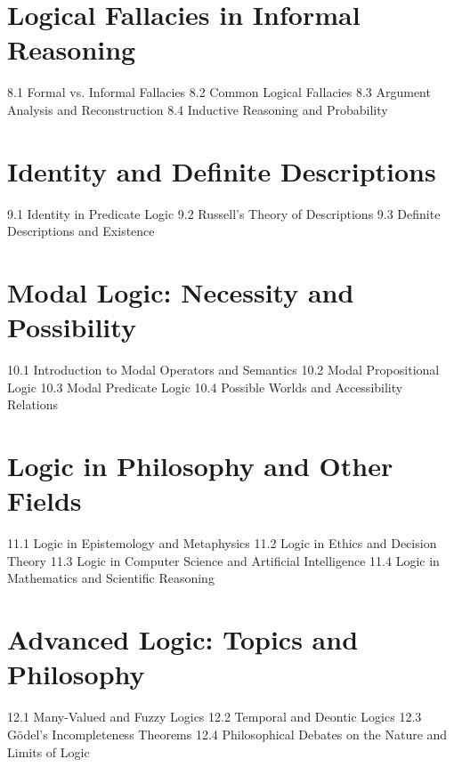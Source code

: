 \section{Logical Fallacies in Informal Reasoning}
8.1 Formal vs. Informal Fallacies
8.2 Common Logical Fallacies
8.3 Argument Analysis and Reconstruction
8.4 Inductive Reasoning and Probability
\section{Identity and Definite Descriptions}
9.1 Identity in Predicate Logic
9.2 Russell's Theory of Descriptions
9.3 Definite Descriptions and Existence
\section{Modal Logic: Necessity and Possibility}
10.1 Introduction to Modal Operators and Semantics
10.2 Modal Propositional Logic
10.3 Modal Predicate Logic
10.4 Possible Worlds and Accessibility Relations
\section{Logic in Philosophy and Other Fields}
11.1 Logic in Epistemology and Metaphysics
11.2 Logic in Ethics and Decision Theory
11.3 Logic in Computer Science and Artificial Intelligence
11.4 Logic in Mathematics and Scientific Reasoning
\section{Advanced Logic: Topics and Philosophy}
12.1 Many-Valued and Fuzzy Logics
12.2 Temporal and Deontic Logics
12.3 Gödel's Incompleteness Theorems
12.4 Philosophical Debates on the Nature and Limits of Logic
